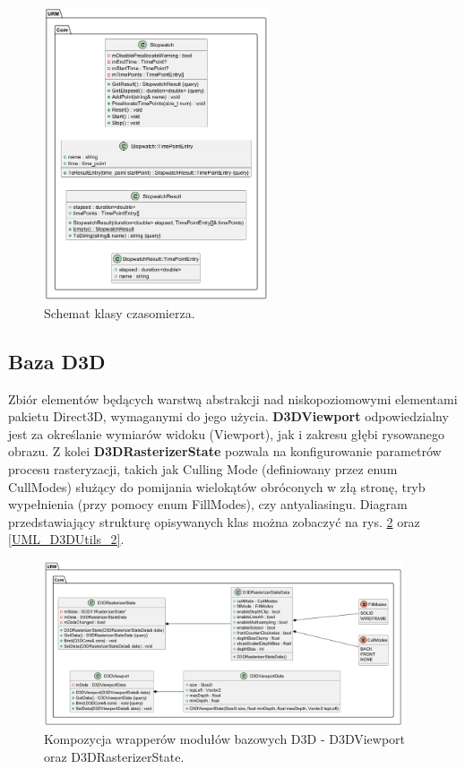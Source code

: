 	\begin{figure}[h!]
		\centering
		\includegraphics[width=250px]{images/UML/stopwatch.png}
		\caption{Schemat klasy czasomierza.}
		\label{UML_Stopwatch}
	\end{figure}
	
\subsection{Baza D3D}
	Zbiór elementów będących warstwą abstrakcji nad niskopoziomowymi elementami pakietu Direct3D, wymaganymi do jego użycia.
	\textbf{D3DViewport} odpowiedzialny jest za określanie wymiarów widoku (Viewport), jak i zakresu głębi rysowanego obrazu.
	Z kolei \textbf{D3DRasterizerState} pozwala na konfigurowanie parametrów procesu rasteryzacji, takich jak Culling Mode (definiowany przez enum CullModes) służący do pomijania wielokątów obróconych w złą stronę, tryb wypełnienia (przy pomocy enum FillModes), czy antyaliasingu.
	Diagram przedstawiający strukturę opisywanych klas można zobaczyć na rys. \ref{UML_D3DUtils_1} oraz \ref{UML_D3DUtils_2}.
	
	\begin{figure}[h!]
		\centering
		\includegraphics[width=400px]{images/UML/d3dutils_1.png}
		\caption{Kompozycja wrapperów modułów bazowych D3D - D3DViewport oraz D3DRasterizerState.}
		\label{UML_D3DUtils_1}
	\end{figure}
	
